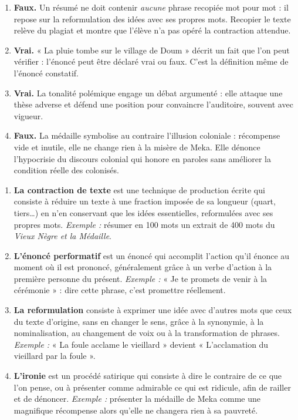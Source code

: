 \documentclass[11pt]{article}
\newcommand{\cle}[1]{{\popxbold\color{popdark}#1}}
\begin{document}
\begin{corrige}
\begin{enumerate}
\item \textbf{Faux.} Un résumé ne doit contenir \emph{aucune} phrase recopiée mot pour mot : il repose sur la \cle{reformulation} des idées avec ses propres mots. Recopier le texte relève du plagiat et montre que l'élève n'a pas opéré la contraction attendue.
\item \textbf{Vrai.} « La pluie tombe sur le village de Doum » décrit un fait que l'on peut vérifier : l'énoncé peut être déclaré vrai ou faux. C'est la définition même de l'énoncé \cle{constatif}.
\item \textbf{Vrai.} La tonalité \cle{polémique} engage un débat argumenté : elle attaque une thèse adverse et défend une position pour convaincre l'auditoire, souvent avec vigueur.
\item \textbf{Faux.} La médaille symbolise au contraire l'\cle{illusion coloniale} : récompense vide et inutile, elle ne change rien à la misère de Meka. Elle dénonce l'hypocrisie du discours colonial qui honore en paroles sans améliorer la condition réelle des colonisés.
\end{enumerate}
\end{corrige}

\begin{corrige}
\begin{enumerate}
\item \textbf{La contraction de texte} est une technique de production écrite qui consiste à réduire un texte à une fraction imposée de sa longueur (quart, tiers\ldots) en n'en conservant que les idées essentielles, reformulées avec ses propres mots. \emph{Exemple :} résumer en 100 mots un extrait de 400 mots du \emph{Vieux Nègre et la Médaille}.
\item \textbf{L'énoncé performatif} est un énoncé qui accomplit l'action qu'il énonce au moment où il est prononcé, généralement grâce à un verbe d'action à la première personne du présent. \emph{Exemple :} « Je te promets de venir à la cérémonie » : dire cette phrase, c'est promettre réellement.
\item \textbf{La reformulation} consiste à exprimer une idée avec d'autres mots que ceux du texte d'origine, sans en changer le sens, grâce à la synonymie, à la nominalisation, au changement de voix ou à la transformation de phrases. \emph{Exemple :} « La foule acclame le vieillard » devient « L'acclamation du vieillard par la foule ».
\item \textbf{L'ironie} est un procédé satirique qui consiste à dire le contraire de ce que l'on pense, ou à présenter comme admirable ce qui est ridicule, afin de railler et de dénoncer. \emph{Exemple :} présenter la médaille de Meka comme une magnifique récompense alors qu'elle ne changera rien à sa pauvreté.
\end{enumerate}
\end{corrige}
\end{document}

